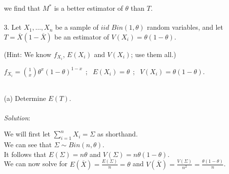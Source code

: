 \documentclass[12pt]{article}
\newcommand{\XB}{\color{black}}
\newcommand{\XBB}{\color{blue}}
\newcommand{\XV}{\color{violet}}
\begin{document}
we find that $ M^{*} $ is a better estimator of $ \theta $ than $ T $. \\


\XBB\hrulefill\XB \\

3. Let $ X_{1}, \dots, X_{n} $ be a sample of $ iid $ $ Bin(1, \theta) $ random variables, and let $ T = \overline{X}(1 - \overline{X}) $ be an estimator of $ V(X_{i}) = \theta(1 - \theta) $. 

(Hint: We know $ f_{X_{i}} $, $ E(X_{i}) $ and $ V(X_{i}) $; use them all.) \\

\begin{center}
    $ \displaystyle f_{X_{i}} = \binom{1}{x} \theta^{x}(1 - \theta)^{1-x} \ \ $; 
    $ \ \ E(X_{i}) =  \theta \ \ $; 
    $ \ \ V(X_{i}) =  \theta(1 - \theta) $. 
\end{center}

\XBB\hrulefill\XB 
\vspace{5mm} \\


(a) Determine $ E(T) $. \\
\vspace{2.5mm} \\
\textit{Solution}:
\vspace{2.5mm}

\noindent 
We will first let $ \displaystyle \sum_{i=1}^{n} X_{i} = \Sigma $ as shorthand. \\

\noindent 
We can see that $ \displaystyle \Sigma \sim Bin(n, \theta) $. \\

\noindent
It follows that $ E(\Sigma) = n\theta $ and $ V(\Sigma) = n\theta(1 - \theta) $. \\

\noindent
We can now solve for $ \displaystyle E(\overline{X}) = \frac{E(\Sigma)}{n} = \theta $ and $ \displaystyle V(\overline{X}) = \frac{V(\Sigma)}{n^2} = \frac{\theta(1 - \theta)}{n} $. \\
\end{document}
